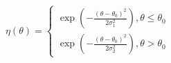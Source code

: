 \documentclass{article}
\begin{document}
$
\eta(\theta)=\begin{cases}\exp{(-\frac{(\theta-\theta_{0})^{2}}{2\sigma_{1}^{ 2}})},\theta\leq\theta_{0}\\ \exp{(-\frac{(\theta-\theta_{0})^{2}}{2\sigma_{2}^{2}})},\theta>\theta_{0}\end{cases}
$
\end{document}
